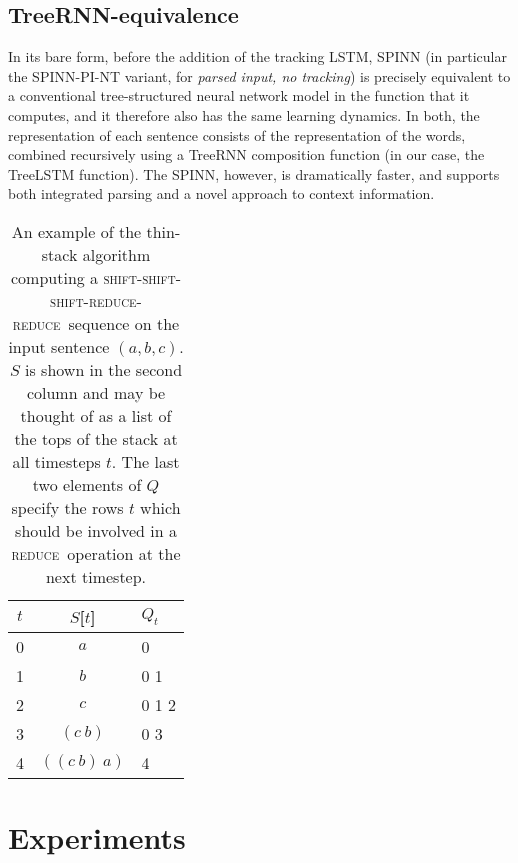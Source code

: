 \documentclass[11pt]{article}
\newcommand{\shift}{\textsc{shift}}
\newcommand{\reduce}{\textsc{reduce}}
\begin{document}
\subsection{TreeRNN-equivalence}

In its bare form, before the addition of the tracking LSTM, SPINN (in particular the SPINN-PI-NT variant, for \textit{parsed input, no tracking}) is precisely equivalent to a conventional tree-structured neural network model in the function that it computes, and it therefore also has the same learning dynamics. In both, the representation of each sentence consists of the representation of the words, combined recursively using a TreeRNN composition function (in our case, the TreeLSTM function). The SPINN, however, is dramatically faster, and supports both integrated parsing and a novel approach to context information.


\begin{table}[t]
\centering
\begin{tabular}{c|cl}
  \toprule
  $t$ & $S$[$t$] & $Q_t$ \\
  \midrule
  0 & $a$ & 0 \\
  1 & $b$ & 0 1 \\
  2 & $c$ & 0 1 2 \\
  3 & $(c~b)$ & 0 3 \\
  4 & $((c~b)~a)$ & 4 \\
  \bottomrule
\end{tabular}
\caption{An example of the thin-stack algorithm computing a \shift-\shift-\shift-\reduce-\reduce~sequence on the input sentence $(a, b, c)$. $S$ is shown in the second column and may be thought of as a list of the tops of the stack at all timesteps $t$. The last two elements of $Q$ specify the rows $t$ which should be involved in a \reduce~operation at the next timestep.}
\label{tbl:thin-stack}
\end{table}

\section{Experiments}
\end{document}
